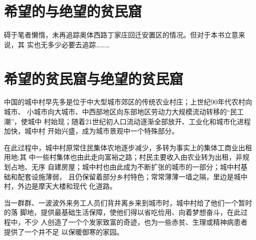 




\section{希望的与绝望的贫民窟}

碍于笔者懒惰，未再追踪奥体西路丁家庄回迁安置区的情况。但对于本书立意来说，其
实也无多少必要去追踪………



\section{希望的贫民窟与绝望的贫民窟}
\label{sec:hopedespair}

中国的城中村早先多是位于中大型城市郊区的传统农业村庄；上世纪90年代农村向城市、
小城市向大城市、中西部地区向东部地区劳动力大规模流动转移的“民工潮”，使城中
村始现；随着21世纪初人口流动逐渐全部放开、工业化和城市化进程加快，城中村
开始兴盛，成为城市景观中一个特殊部分。

在此过程中，城中村原常住民集体农地逐步减少，多转为事实上的集体工商业出租用地;其
中一些村集体也由此走向富裕之路；村民主要收入由农业转为出租，非规划占地、无序
自建房屋；城中村也由此成为不断扩张的城市的一部分；城中村基础和配套设施薄弱，
且仍保留着部分乡村特色；常常薄薄一墙之隔，里边是城中村，外边是摩天大楼和现代
化道路。

当一群群、一波波外来务工人员们背井离乡来到城市时，城中村给了他们一个暂时的落
脚地，提供最基础生活保障，使他们得以省吃俭用、向着梦想奋斗，在此过程中，不少
人创造了一个个发家致富的奇迹，也为一些赤贫、生理或精神病患者提供了一个并不足
以保暖御寒的家园。

